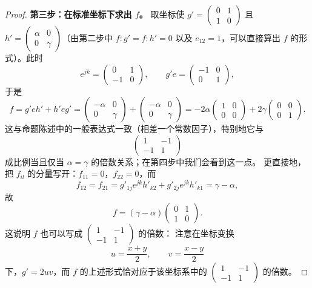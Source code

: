 \begin{proof}
\textbf{第三步：在标准坐标下求出 $f$。} 取坐标使
$g'=\begin{pmatrix}0&1\\1&0\end{pmatrix}$ 且
$h'=\begin{pmatrix}\alpha&0\\0&\gamma\end{pmatrix}$（由第二步中 $f:g'=f:h'=0$
以及 $e_{12}=1$，可以直接算出 $f$ 的形式）。此时
\[
e^{jk}=\begin{pmatrix}0&1\\-1&0\end{pmatrix},\qquad
g'e=\begin{pmatrix}-1&0\\0&1\end{pmatrix},
\]
于是
\[
f=g'e h'+h'e g'
=\begin{pmatrix}-\alpha&0\\0&\gamma\end{pmatrix}
+\begin{pmatrix}-\alpha&0\\0&\gamma\end{pmatrix}
=-2\alpha\begin{pmatrix}1&0\\0&0\end{pmatrix}
+2\gamma\begin{pmatrix}0&0\\0&1\end{pmatrix}.
\]
这与命题陈述中的一般表达式一致（相差一个常数因子），特别地它与
\[
\begin{pmatrix}1&-1\\-1&1\end{pmatrix}
\]
成比例当且仅当 $\alpha=\gamma$ 的倍数关系；在第四步中我们会看到这一点。
更直接地，把 $f_{il}$ 的分量写开：$f_{11}=0$，$f_{22}=0$，而
\[
f_{12}=f_{21}=g'_{1j}e^{jk}h'_{k2}+g'_{2j}e^{jk}h'_{k1}=\gamma-\alpha,
\]
故
\[
f=(\gamma-\alpha)\begin{pmatrix}0&1\\1&0\end{pmatrix}.
\]
这说明 $f$ 也可以写成 $\begin{pmatrix}1&-1\\-1&1\end{pmatrix}$ 的倍数：
注意在坐标变换
\[
u=\frac{x+y}{2},\qquad v=\frac{x-y}{2}
\]
下，$g'=2uv$，而 $f$ 的上述形式恰对应于该坐标系中的 $\begin{pmatrix}1&-1\\-1&1\end{pmatrix}$ 的倍数。
\end{proof}

